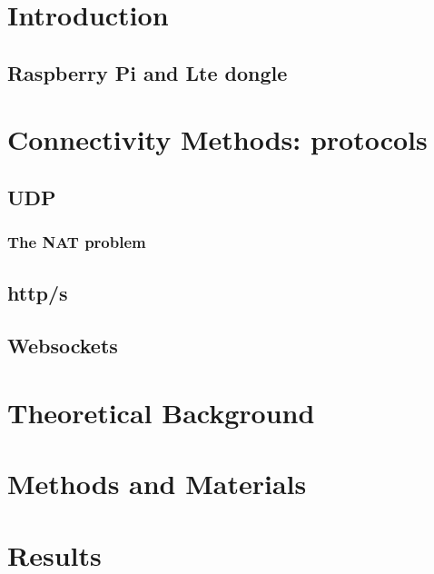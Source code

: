 \documentclass[hidelinks,11pt,a4paper,oneside,article]{memoir}
\begin{document}
	\setcounter{page}{1} %
	\ClearWallPaper
	
	\sloppy %
	
	\chapter{Introduction}
	
	

	
	\section{Raspberry Pi and Lte dongle}
	
	\chapter{Connectivity Methods: protocols}
	
	\section{UDP}
	
	\subsection{The NAT problem}
	
	\section{http/s}
	\cite{http-rfc}
	
	\section{Websockets}
	\cite[p.~30]{rfc6455}
	
	\chapter{Theoretical Background}
	\chapter{Methods and Materials}
	\chapter{Results}
\end{document}
